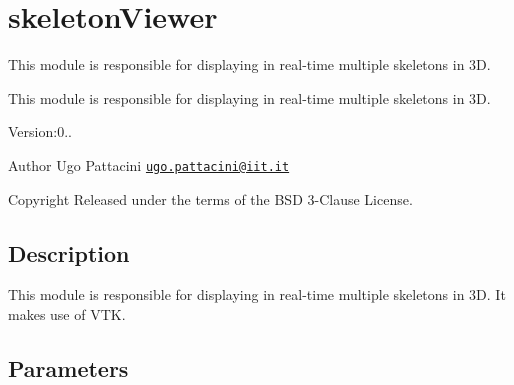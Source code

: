 \section{skeleton\+Viewer}
\label{group__skeletonViewer}


This module is responsible for displaying in real-\/time multiple skeletons in 3D.  


This module is responsible for displaying in real-\/time multiple skeletons in 3D. 

Version\+:0.. \begin{DoxyAuthor}{Author}
Ugo Pattacini \href{mailto:ugo.pattacini@iit.it}{\tt ugo.\+pattacini@iit.\+it} ~\newline
 
\end{DoxyAuthor}
\begin{DoxyCopyright}{Copyright}
Released under the terms of the B\+SD 3-\/\+Clause License. 
\end{DoxyCopyright}
\hypertarget{group__skeletonViewer_intro_sec}{}\subsection{Description}\label{group__skeletonViewer_intro_sec}
This module is responsible for displaying in real-\/time multiple skeletons in 3D. It makes use of V\+TK.\hypertarget{group__skeletonViewer_parameters_sec}{}\subsection{Parameters}\label{group__skeletonViewer_parameters_sec}

